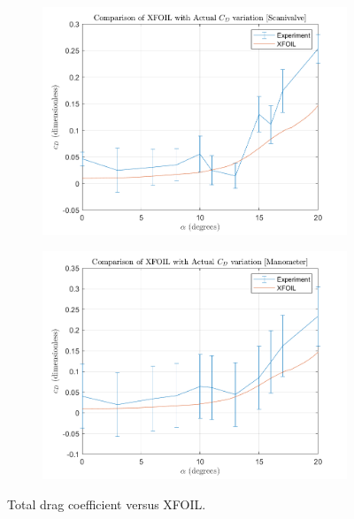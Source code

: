 \documentclass[runningheads]{llncs}
\begin{document}
\begin{figure}
    \centering
    \begin{subfigure}[b]{0.45\textwidth}
         \centering
         \includegraphics[width=\textwidth]{figures/scanivalve_cd.png}
         \caption{}
         \label{fig:scanivalve_drag_coef}
     \end{subfigure}
     \begin{subfigure}[b]{0.45\textwidth}
         \centering
         \includegraphics[width=\textwidth]{figures/manometer_cd.png}
         \caption{}
         \label{fig:manometer_drag_coef}
     \end{subfigure}
    \caption{Total drag coefficient versus XFOIL.}
    \label{fig:total_drag_coefficient}
\end{figure}
\end{document}
